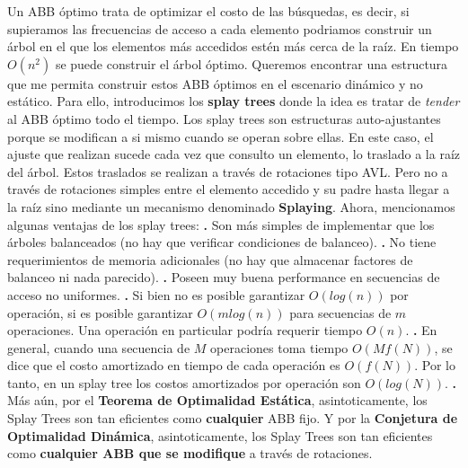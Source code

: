 \documentclass[10pt,a4paper]{article}
\begin{document}
Un ABB óptimo trata de optimizar el costo de las búsquedas, es decir, si supieramos las frecuencias de acceso a cada elemento podriamos construir un árbol en el que los elementos más accedidos estén más cerca de la raíz.
\newline
\newline
En tiempo $O(n^{2})$ se puede construir el árbol óptimo.
\newline
\newline
Queremos encontrar una estructura que me permita construir estos ABB óptimos en el escenario dinámico y no estático.
\newline
\newline
Para ello, introducimos los \textbf{splay trees} donde la idea es tratar de \textit{tender} al ABB óptimo todo el tiempo.
\newline
\newline
Los splay trees son estructuras auto-ajustantes porque se modifican a si mismo cuando se operan sobre ellas. En este caso, el ajuste que realizan sucede cada vez que consulto un elemento, lo traslado a la raíz del árbol. 
\newline
\newline
Estos traslados se realizan a través de rotaciones tipo AVL. Pero no a través de rotaciones simples entre el elemento accedido y su padre hasta llegar a la raíz sino mediante un mecanismo denominado \textbf{Splaying}.
\newline
\newline
Ahora, mencionamos algunas ventajas de los splay trees:
\newline
\newline
\textbf{.} Son más simples de implementar que los árboles balanceados (no hay que verificar condiciones de balanceo).
\newline
\newline
\textbf{.} No tiene requerimientos de memoria adicionales (no hay que almacenar factores de balanceo ni nada parecido).
\newline
\newline
\textbf{.} Poseen muy buena performance en secuencias de acceso no uniformes.
\newline
\newline
\textbf{.} Si bien no es posible garantizar $O(log(n))$ por operación, si es posible garantizar $O(m log(n))$ para secuencias de $m$ operaciones. Una operación en particular podría requerir tiempo $O(n)$.
\newline
\newline
\textbf{.} En general, cuando una secuencia de $M$ operaciones toma tiempo $O(M f(N))$, se dice que el costo amortizado  en tiempo de cada operación es $O(f(N))$. Por lo tanto, en un splay tree los costos amortizados por operación son $O(log(N))$. 
\newline
\newline
\textbf{.} Más aún, por el \textbf{Teorema de Optimalidad Estática}, asintoticamente, los Splay Trees son tan eficientes como \textbf{cualquier} ABB fijo.
\newline
\newline
Y por la \textbf{Conjetura de Optimalidad Dinámica}, asintoticamente, los Splay Trees son tan eficientes como \textbf{cualquier ABB que se modifique} a través de rotaciones.
\end{document}
